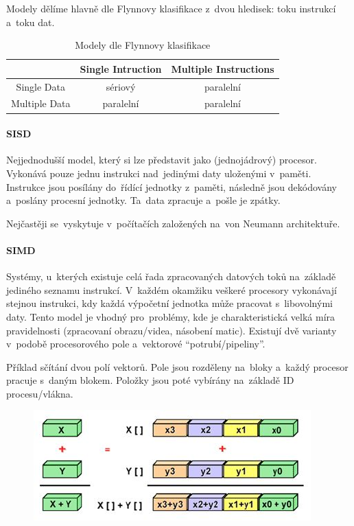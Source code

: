 Modely dělíme hlavně dle Flynnovy klasifikace z~dvou hledisek: toku instrukcí a~toku dat.

\begin{table}[ht]
	\centering
	\caption{Modely dle Flynnovy klasifikace}

	\begin{tabular}{c|cc}
		{}            & Single Intruction & Multiple Instructions \\
		\hline
		Single Data   & sériový           & paralelní             \\
		Multiple Data & paralelní         & paralelní             \\
	\end{tabular}
\end{table}

\paragraph{SISD}

Nejjednodušší model, který si lze představit jako (jednojádrový) procesor. Vykonává pouze jednu instrukci nad~jedinými daty uloženými v~paměti. Instrukce jsou posílány do~řídící jednotky z~paměti, následně jsou dekódovány a~poslány procesní jednotky. Ta~data zpracuje a~pošle je zpátky.

Nejčastěji se~vyskytuje v~počítačích založených na~von Neumann architektuře.

\paragraph{SIMD}

Systémy, u~kterých existuje celá řada zpracovaných datových toků na~základě jediného seznamu instrukcí. V~každém okamžiku veškeré procesory vykonávají stejnou instrukci, kdy každá výpočetní jednotka může pracovat s~libovolnými daty. Tento model je vhodný pro~problémy, kde je charakteristická velká míra pravidelnosti (zpracovaní obrazu/videa, násobení matic). Existují dvě varianty v~podobě procesorového pole a~vektorové \enquote{potrubí/pipeliny}.

Příklad sčítání dvou polí vektorů. Pole jsou rozděleny na~bloky a~každý procesor pracuje s~daným blokem. Položky jsou poté vybírány na~základě ID procesu/vlákna.

\begin{figure}[ht]
	\centering
	\includegraphics[scale=0.7]{images/SIMD.JPG}
\end{figure}

